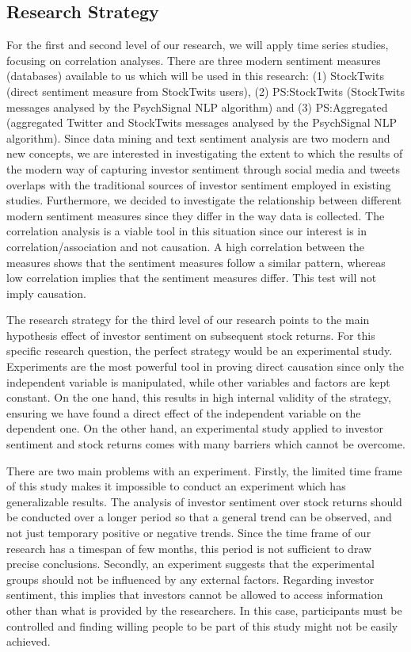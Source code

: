 \subsection{Research Strategy} \label{research_strategy}
For the first and second level of our research, we will apply time series studies, focusing on correlation analyses. There are three modern sentiment measures (databases) available to us which will be used in this research: (1) StockTwits (direct sentiment measure from StockTwits users), (2) PS:StockTwits (StockTwits messages analysed by the PsychSignal NLP algorithm) and (3) PS:Aggregated (aggregated Twitter and StockTwits messages analysed by the PsychSignal NLP algorithm). Since data mining and text sentiment analysis are two modern and new concepts, we are interested in investigating the extent to which the results of the modern way of capturing investor sentiment through social media and tweets overlaps with the traditional sources of investor sentiment employed in existing studies. Furthermore, we decided to investigate the relationship between different modern sentiment measures since they differ in the way data is collected. The correlation analysis is a viable tool in this situation since our interest is in correlation/association and not causation. A high correlation between the measures shows that the sentiment measures follow a similar pattern, whereas low correlation implies that the sentiment measures differ. This test will not imply causation.
\par
The research strategy for the third level of our research points to the main hypothesis effect of investor sentiment on subsequent stock returns. For this specific research question, the perfect strategy would be an experimental study. Experiments are the most powerful tool in proving direct causation since only the independent variable is manipulated, while other variables and factors are kept constant. On the one hand, this results in high internal validity of the strategy, ensuring we have found a direct effect of the independent variable on the dependent one. On the other hand, an experimental study applied to investor sentiment and stock returns comes with many barriers which cannot be overcome.
\par
There are two main problems with an experiment. Firstly, the limited time frame of this study makes it impossible to conduct an experiment which has generalizable results. The analysis of investor sentiment over stock returns should be conducted over a longer period so that a general trend can be observed, and not just temporary positive or negative trends. Since the time frame of our research has a timespan of few months, this period is not sufficient to draw precise conclusions. Secondly, an experiment suggests that the experimental groups should not be influenced by any external factors. Regarding investor sentiment, this implies that investors cannot be allowed to access information other than what is provided by the researchers. In this case, participants must be controlled and finding willing people to be part of this study might not be easily achieved.
